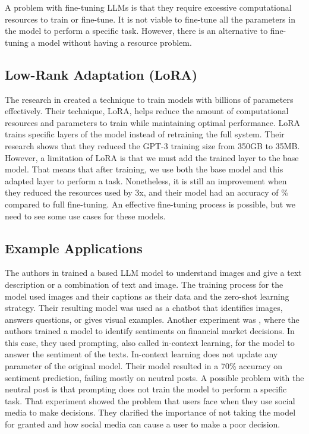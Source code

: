 A problem with fine-tuning LLMs is that they require excessive computational resources to train or fine-tune. It is not viable to fine-tune all the parameters in the model to perform a specific task. However, there is an
alternative to fine-tuning a model without having a resource problem.


\subsection{Low-Rank Adaptation (LoRA)}
The research in \cite{hu2021loralowrankadaptationlarge} created a technique to train models with billions of parameters effectively. Their technique, LoRA, helps reduce the amount of computational resources and
parameters to train while maintaining optimal performance. LoRA trains specific layers of the model instead of retraining the full system. Their research shows that they reduced the GPT-3 training size from 350GB to
35MB. However, a limitation of LoRA is that we must add the trained layer to the base model. That means that after training, we use both the base model and this adapted layer to perform a task. Nonetheless, it is still an
improvement when they reduced the resources used by 3x, and their model had an accuracy of \% compared to full fine-tuning. An effective fine-tuning process is possible, but we need to see some use
cases for these models.

\subsection{Example Applications}
The authors in \cite{koh2023groundinglanguagemodelsimages} trained a based LLM model to understand images and give a text description or a combination of text and image. The training process for
the model used images and their captions as their data and the zero-shot learning strategy. Their resulting model was used as a chatbot that identifies images, answers questions, or gives
visual examples. Another experiment was \cite{inproceedings}, where the authors trained a model to identify sentiments on financial market decisions. In this case, they used prompting, also called in-context learning, for 
the model to answer the sentiment of the texts. In-context learning does not update any parameter of the original model. Their model resulted in a 70\% accuracy on sentiment prediction, failing mostly on neutral posts.
A possible problem with the neutral post is that prompting does not train the model to perform a specific task. That experiment showed the problem that users face when they use social media to make decisions.
They clarified the importance of not taking the model for granted and how social media can cause a user to make a poor decision.


